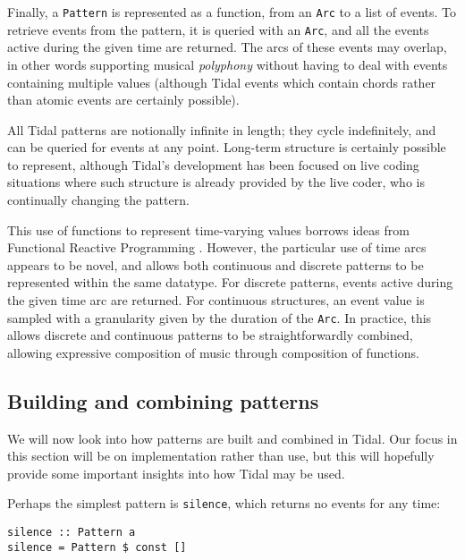 \documentclass[authoryear,preprint]{sigplanconf}
\begin{document}
Finally, a \lstinline{Pattern} is represented as a function, from an
\lstinline{Arc} to a list of events. To retrieve events from the
pattern, it is queried with an \lstinline{Arc}, and all the events
active during the given time are returned. The arcs of these events
may overlap, in other words supporting musical \emph{polyphony}
without having to deal with events containing multiple values
(although Tidal events which contain chords rather than atomic events
are certainly possible).

All Tidal patterns are notionally infinite in length; they cycle
indefinitely, and can be queried for events at any point. Long-term
structure is certainly possible to represent, although Tidal's
development has been focused on live coding situations where such
structure is already provided by the live coder, who is continually
changing the pattern.


This use of functions to represent time-varying values borrows ideas
from Functional Reactive Programming \citep{Elliott09}. However, the
particular use of time arcs appears to be novel, and allows both
continuous and discrete patterns to be represented within the same
datatype. For discrete patterns, events active during the given time
arc are returned. For continuous structures, an event value is sampled
with a granularity given by the duration of the \lstinline{Arc}. In
practice, this allows discrete and continuous patterns to be
straightforwardly combined, allowing expressive composition of music
through composition of functions.

\subsection{Building and combining patterns}

We will now look into how patterns are built and combined in
Tidal. Our focus in this section will be on implementation rather than
use, but this will hopefully provide some important insights into how
Tidal may be used.

Perhaps the simplest pattern is \lstinline{silence}, which returns no
events for any time:

\begin{center}
\begin{minipage}{0.5\textwidth}
\begin{lstlisting}
silence :: Pattern a
silence = Pattern $ const []
\end{lstlisting}
\end{minipage}
\end{center}
\end{document}

